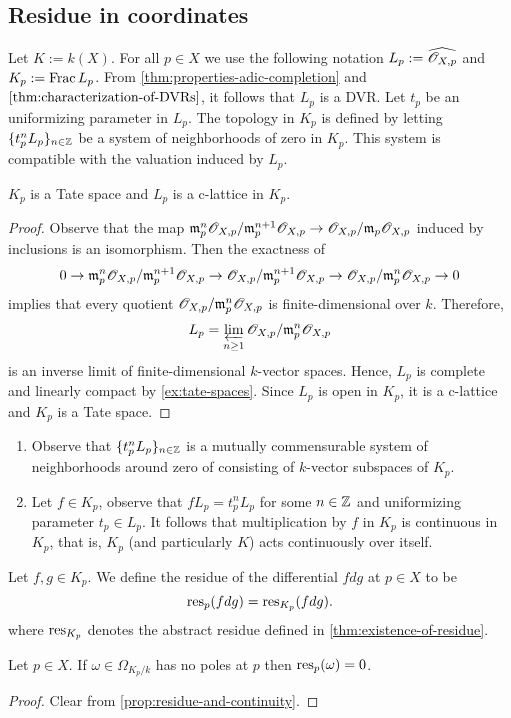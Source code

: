 \subsection{Residue in coordinates}
Let $K := k(X)$. For all $p \in X$ we use the following notation $L_{p} := \widehat{{\mathscr O}_{X,p}}$ and $K_{p}:=\operatorname{Frac} L_{p}$. From \cref{thm:properties-adic-completion} and $\cref{thm:characterization-of-DVRs}$, it follows that $L_{p}$ is a DVR. Let $t_{p}$ be an uniformizing parameter in $L_{p}$. The topology in $K_{p}$ is defined by letting $\{t_{p}^{n}L_{p}\}_{n\in {\mathbb Z}}$ be a system of neighborhoods of zero in $K_{p}$. This system is compatible with the valuation induced by $L_{p}$.
\begin{proposition}\label{prop:complete-fraction-field-is-a-Tate-space}
	$K_{p}$ is a Tate space and $L_{p}$ is a c-lattice in $K_{p}$.
\end{proposition}
\begin{proof}
	Observe that the map $\mathfrak{m}_{p}^{n}{\mathscr O}_{X,p}/\mathfrak{m}_{p}^{n+1}{\mathscr O}_{X,p} \to {\mathscr O}_{X,p}/\mathfrak{m}_{p}{\mathscr O}_{X,p}$ induced by inclusions is an isomorphism. Then the exactness of
	\[
		0 \to \mathfrak{m}_{p}^{n}{\mathscr O}_{X,p}/\mathfrak{m}_{p}^{n+1}{\mathscr O}_{X,p} \to {\mathscr O}_{X,p}/\mathfrak{m}_{p}^{n+1}{\mathscr O}_{X,p} \to {\mathscr O}_{X,p}/\mathfrak{m}_{p}^{n}{\mathscr O}_{X,p} \to 0
	\]
	implies that every quotient ${\mathscr O}_{X,p}/\mathfrak{m}_{p}^{n}{\mathscr O}_{X,p}$ is finite-dimensional over $k$. Therefore, 
	\[
		L_{p} = \varprojlim_{n\geq 1} {\mathscr O}_{X,p}/\mathfrak{m}_{p}^{n}{\mathscr O}_{X,p}
	\]
	is an inverse limit of finite-dimensional $k$-vector spaces. Hence, $L_{p}$ is complete and linearly compact by \cref{ex:tate-spaces}. Since $L_{p}$ is open in $K_{p}$, it is a c-lattice and $K_{p}$ is a Tate space.
\end{proof}
\begin{remark}\label{rem:mutually-commensurable-system}
\begin{enumerate}[label = (\alph*)]
	\item Observe that $\{t_{p}^{n}L_{p}\}_{n\in {\mathbb Z}}$ is a mutually commensurable system of neighborhoods around zero of consisting of $k$-vector subspaces of $K_{p}$. 
	\item Let $f\in K_{p}$, observe that $fL_{p} = t_{p}^{n}L_{p}$ for some $n \in {\mathbb Z}$ and uniformizing parameter $t_{p} \in L_{p}$. It follows that multiplication by $f$ in $K_{p}$ is continuous in $K_{p}$, that is, $K_{p}$ (and particularly $K$) acts continuously over itself.
\end{enumerate}
\end{remark}
\begin{definition}\label{def:residue-at-p}
	Let $f,g \in K_{p}$. We define the residue of the differential $fdg$ at $p\in X$ to be
	\[
		\operatorname{res}_{p}(fdg) = \operatorname{res}_{K_{p}}(fdg).
	\]
	where $\operatorname{res}_{K_{p}}$ denotes the abstract residue defined in \cref{thm:existence-of-residue}.
\end{definition} 
\begin{proposition}\label{prop:no-poles-zero-residue}
	Let $p\in X$. If $\omega \in \Omega_{K_{p}/k}$ has no poles at $p$ then $\operatorname{res}_{p}(\omega) = 0$.
\end{proposition}
\begin{proof}
	Clear from \cref{prop:residue-and-continuity}.
\end{proof}

